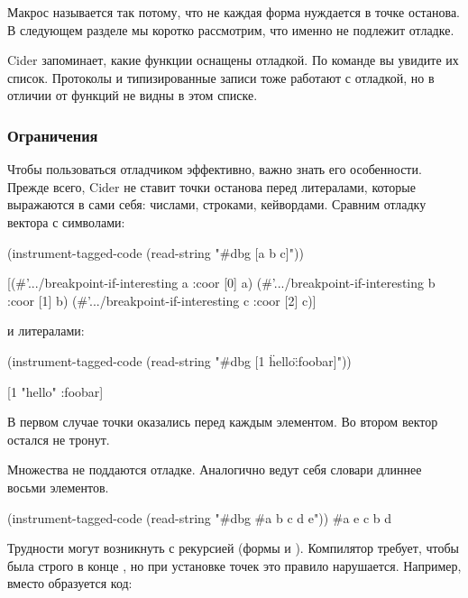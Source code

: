 Макрос  называется так потому, что не каждая форма нуждается в точке останова. В следующем разделе мы коротко рассмотрим, что именно не подлежит отладке.

Cider запоминает, какие функции оснащены отладкой. По команде  вы увидите их список. Протоколы и типизированные записи тоже работают с отладкой, но в отличии от функций не видны в этом списке.

\subsubsection{Ограничения}

Чтобы пользоваться отладчиком эффективно, важно знать его особенности. Прежде всего, Cider не ставит точки останова перед литералами, которые выражаются в сами себя: числами, строками, кейвордами. Сравним отладку вектора с символами:

\begin{english}
  \begin{clojure}
(instrument-tagged-code
 (read-string "#dbg [a b c]"))

[(#'.../breakpoint-if-interesting a {:coor [0]} a)
 (#'.../breakpoint-if-interesting b {:coor [1]} b)
 (#'.../breakpoint-if-interesting c {:coor [2]} c)]
  \end{clojure}
\end{english}

и литералами:

\begin{english}
  \begin{clojure}
(instrument-tagged-code
 (read-string "#dbg [1 \"hello\" :foobar]"))

[1 "hello" :foobar]
  \end{clojure}
\end{english}

В первом случае точки оказались перед каждым элементом. Во втором вектор остался не тронут.

Множества не поддаются отладке. Аналогично ведут себя словари длиннее восьми элементов.

\begin{english}
  \begin{clojure}
(instrument-tagged-code
 (read-string "#dbg #{a b c d e}"))
#{a e c b d}
  \end{clojure}
\end{english}

Трудности могут возникнуть с рекурсией (формы  и ). Компилятор требует, чтобы  была строго в конце , но при установке точек это правило нарушается. Например, вместо  образуется код:

